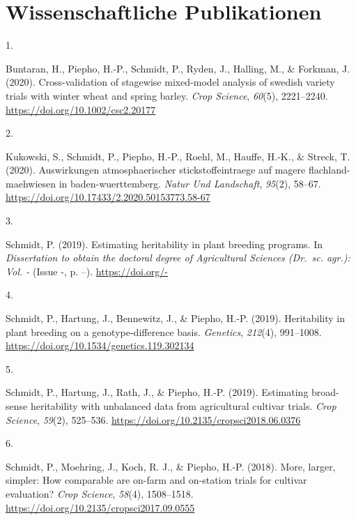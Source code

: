 \documentclass[11pt, a4paper]{awesome-cv}
\newlength{\csllabelwidth}
\newcommand{\CSLLeftMargin}[1]{\parbox[t]{\csllabelwidth}{#1}}
\newcommand{\CSLRightInline}[1]{\parbox[t]{\linewidth - \csllabelwidth}{#1}}
\begin{document}
\hypertarget{wissenschaftliche-publikationen}{%
\section{Wissenschaftliche
Publikationen}\label{wissenschaftliche-publikationen}}

\footnotesize

\hypertarget{bibliography}{}
\leavevmode\hypertarget{ref-Buntaran2020}{}%
\CSLLeftMargin{1. }
\CSLRightInline{Buntaran, H., Piepho, H.-P., Schmidt, P., Ryden, J.,
Halling, M., \& Forkman, J. (2020). Cross-validation of stagewise
mixed-model analysis of swedish variety trials with winter wheat and
spring barley. \emph{Crop Science}, \emph{60}(5), 2221--2240.
\url{https://doi.org/10.1002/csc2.20177}}

\leavevmode\hypertarget{ref-Kukowski2020}{}%
\CSLLeftMargin{2. }
\CSLRightInline{Kukowski, S., Schmidt, P., Piepho, H.-P., Roehl, M.,
Hauffe, H.-K., \& Streck, T. (2020). Auswirkungen atmosphaerischer
stickstoffeintraege auf magere flachland-maehwiesen in
baden-wuerttemberg. \emph{Natur Und Landschaft}, \emph{95}(2), 58--67.
\url{https://doi.org/10.17433/2.2020.50153773.58-67}}

\leavevmode\hypertarget{ref-Schmidt2019}{}%
\CSLLeftMargin{3. }
\CSLRightInline{Schmidt, P. (2019). Estimating heritability in plant
breeding programs. In \emph{Dissertation to obtain the doctoral degree
of Agricultural Sciences (Dr.~sc. agr.): Vol. -} (Issue -, p. --).
\url{https://doi.org/-}}

\leavevmode\hypertarget{ref-Schmidt2019b}{}%
\CSLLeftMargin{4. }
\CSLRightInline{Schmidt, P., Hartung, J., Bennewitz, J., \& Piepho,
H.-P. (2019). Heritability in plant breeding on a genotype-difference
basis. \emph{Genetics}, \emph{212}(4), 991--1008.
\url{https://doi.org/10.1534/genetics.119.302134}}

\leavevmode\hypertarget{ref-Schmidt2019c}{}%
\CSLLeftMargin{5. }
\CSLRightInline{Schmidt, P., Hartung, J., Rath, J., \& Piepho, H.-P.
(2019). Estimating broad-sense heritability with unbalanced data from
agricultural cultivar trials. \emph{Crop Science}, \emph{59}(2),
525--536. \url{https://doi.org/10.2135/cropsci2018.06.0376}}

\leavevmode\hypertarget{ref-Schmidt2018}{}%
\CSLLeftMargin{6. }
\CSLRightInline{Schmidt, P., Moehring, J., Koch, R. J., \& Piepho, H.-P.
(2018). More, larger, simpler: How comparable are on-farm and on-station
trials for cultivar evaluation? \emph{Crop Science}, \emph{58}(4),
1508--1518. \url{https://doi.org/10.2135/cropsci2017.09.0555}}
\end{document}

